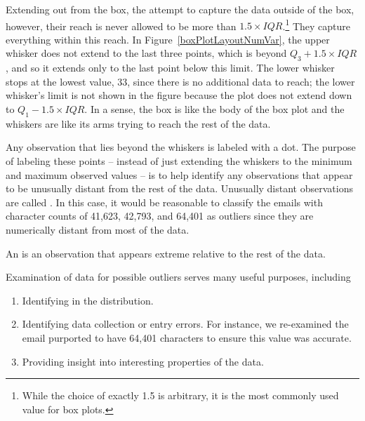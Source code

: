 Extending out from the box, the  attempt to capture the data outside of the box, however, their reach is never allowed to be more than $1.5\times IQR$.\footnote{While the choice of exactly 1.5 is arbitrary, it is the most commonly used value for box plots.} They capture everything within this reach. In Figure~\ref{boxPlotLayoutNumVar}, the upper whisker does not extend to the last three points, which is beyond $Q_3 + 1.5\times IQR$, and so it extends only to the last point below this limit. The lower whisker stops at the lowest value, 33, since there is no additional data to reach; the lower whisker's limit is not shown in the figure because the plot does not extend down to $Q_1 - 1.5\times IQR$. In a sense, the box is like the body of the box plot and the whiskers are like its arms trying to reach the rest of the data.

Any observation that lies beyond the whiskers is labeled with a dot. The purpose of labeling these points -- instead of just extending the whiskers to the minimum and maximum observed values -- is to help identify any observations that appear to be unusually distant from the rest of the data. Unusually distant observations are called . In this case, it would be reasonable to classify the emails with character counts of 41,623, 42,793, and 64,401 as outliers since they are numerically distant from most of the data.

\begin{termBox}{
An  is an observation that appears extreme relative to the rest of the data.}
\end{termBox}


\begin{tipBox}{
Examination of data for possible outliers serves many useful purposes, including\vspace{-2mm}
\begin{enumerate}
\setlength{\itemsep}{0mm}
\item Identifying  in the distribution.
\item Identifying data collection or entry errors. For instance, we re-examined the email purported to have 64,401 characters to ensure this value was accurate.
\item Providing insight into interesting properties of the data.\vspace{0.5mm}
\end{enumerate}}
\end{tipBox}

